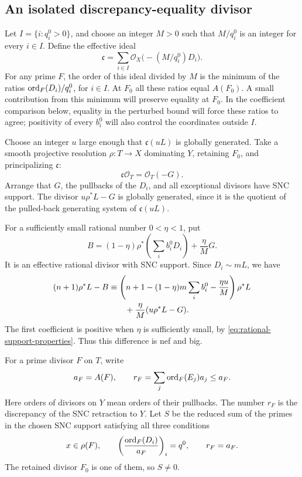 \subsection{An isolated discrepancy-equality divisor}

Let $I=\{i:q_i^0>0\}$, and choose an integer $M>0$ such that $M/q_i^0$ is an integer for every $i\in I$.  Define the effective ideal
\begin{equation}
 \mathfrak{c}=
 \sum_{i\in I}\mathcal{O}_X\bigl(-(M/q_i^0)D_i\bigr).
 \label{eq:isolating-ideal}
\end{equation}
For any prime $F$, the order of this ideal divided by $M$ is the minimum of the ratios $\operatorname{ord}_F(D_i)/q_i^0$, for $i\in I$. At $F_0$ all these ratios equal ${A}(F_0)$. A small contribution from this minimum will preserve equality at $F_0$. In the coefficient comparison below, equality in the perturbed bound will force these ratios to agree; positivity of every $b_i^0$ will also control the coordinates outside $I$.

Choose an integer $u$ large enough that $\mathfrak{c}(uL)$ is globally generated.  Take a smooth projective resolution $\rho:T\to X$ dominating $Y$, retaining $F_0$, and principalizing $\mathfrak{c}$:
\[
 \mathfrak{c}\mathcal{O}_T=\mathcal{O}_T(-G).
\]
Arrange that $G$, the pullbacks of the $D_i$, and all exceptional divisors have SNC support.  The divisor $u\rho^*L-G$ is globally generated, since it is the quotient of the pulled-back generating system of $\mathfrak{c}(uL)$.

For a sufficiently small rational number $0<\eta<1$, put
\begin{equation}
 B=(1-\eta)\rho^*\left(\sum_i b_i^0D_i\right)
       +\frac{\eta}{M}G.
 \label{eq:perturbed-boundary}
\end{equation}
It is an effective rational divisor with SNC support.  Since $D_i\sim mL$, we have
\begin{align}
 (n+1)\rho^*L-B
 &\equiv
 \left(n+1-(1-\eta)m\sum_i b_i^0-\frac{\eta u}{M}\right)\rho^*L
 \notag\\
 &\hspace{2em}+\frac{\eta}{M}(u\rho^*L-G).
 \label{eq:boundary-nef-big}
\end{align}
The first coefficient is positive when $\eta$ is sufficiently small, by \eqref{eq:rational-support-properties}.  Thus this difference is nef and big.

For a prime divisor $F$ on $T$, write
\[
 a_F={A}(F),\qquad
 r_F=\sum_j\operatorname{ord}_F(E_j)a_j\leq a_F.
\]
Here orders of divisors on $Y$ mean orders of their pullbacks. The number $r_F$ is the discrepancy of the SNC retraction to $Y$.  Let $S$ be the reduced sum of the primes in the chosen SNC support satisfying all three conditions
\begin{equation}
 x\in\rho(F),\qquad
 \left(\frac{\operatorname{ord}_F(D_i)}{a_F}\right)_i=q^0,
 \qquad r_F=a_F.
 \label{eq:equality-divisor-definition}
\end{equation}
The retained divisor $F_0$ is one of them, so $S\ne0$.


